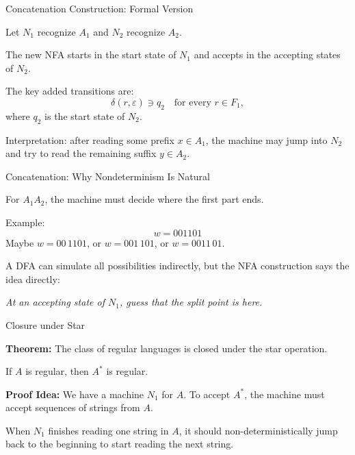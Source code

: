 \documentclass[10pt,aspectratio=169]{beamer}
\newcommand{\eps}{\varepsilon}
\begin{document}
\begin{frame}{Concatenation Construction: Formal Version}

Let $N_1$ recognize $A_1$ and $N_2$ recognize $A_2$.

\vspace{0.8em}
The new NFA starts in the start state of $N_1$ and accepts in the accepting states of $N_2$.

\vspace{0.8em}
The key added transitions are:
\[
\delta(r,\eps) \ni q_2 \quad \text{for every } r \in F_1,
\]
where $q_2$ is the start state of $N_2$.

\vspace{0.8em}
Interpretation: after reading some prefix $x\in A_1$, the machine may jump into $N_2$ and try to read the remaining suffix $y\in A_2$.

\end{frame}

\begin{frame}{Concatenation: Why Nondeterminism Is Natural}

For $A_1A_2$, the machine must decide where the first part ends.

\vspace{0.8em}
Example:
\[
w=001101
\]
Maybe $w=00\,1101$, or $w=001\,101$, or $w=0011\,01$.

\vspace{0.8em}
A DFA can simulate all possibilities indirectly, but the NFA construction says the idea directly:

\vspace{0.6em}
\begin{center}
\textit{At an accepting state of $N_1$, guess that the split point is here.}
\end{center}

\end{frame}

\begin{frame}{Closure under Star}

\textbf{Theorem:} The class of regular languages is closed under the star operation.

\vspace{1em}

If $A$ is regular, then $A^*$ is regular.

\vspace{1em}
\pause

\textbf{Proof Idea:} 
We have a machine $N_1$ for $A$. To accept $A^*$, the machine must accept sequences of strings from $A$. 

When $N_1$ finishes reading one string in $A$, it should non-deterministically jump back to the beginning to start reading the next string.

\end{frame}
\end{document}
